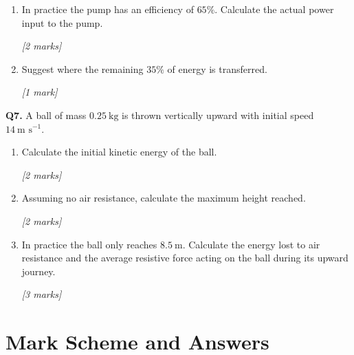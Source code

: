 \begin{tcolorbox}[colback=white, colframe=midblue, breakable]
\begin{minipage}{\linewidth}
\begin{enumerate}[label=(\alph*)]
  \item In practice the pump has an efficiency of $65\%$. Calculate the actual power input to the pump.
  \par\hfill\textit{[2 marks]}
  \vspace{3cm}

  \item Suggest where the remaining $35\%$ of energy is transferred.
  \par\hfill\textit{[1 mark]}
  \vspace{2cm}
\end{enumerate}
\end{minipage}

\begin{minipage}{\linewidth}
\textbf{Q7.} A ball of mass $0.25\ \text{kg}$ is thrown vertically upward with initial speed $14\ \text{m s}^{-1}$.

\begin{enumerate}[label=(\alph*)]
  \item Calculate the initial kinetic energy of the ball.
  \par\hfill\textit{[2 marks]}
  \vspace{2.5cm}

  \item Assuming no air resistance, calculate the maximum height reached.
  \par\hfill\textit{[2 marks]}
  \vspace{3cm}

  \item In practice the ball only reaches $8.5\ \text{m}$. Calculate the energy lost to air resistance and the average resistive force acting on the ball during its upward journey.
  \par\hfill\textit{[3 marks]}
  \vspace{3.5cm}
\end{enumerate}
\end{minipage}

\end{tcolorbox}


\pagebreak

\section{Mark Scheme and Answers}

